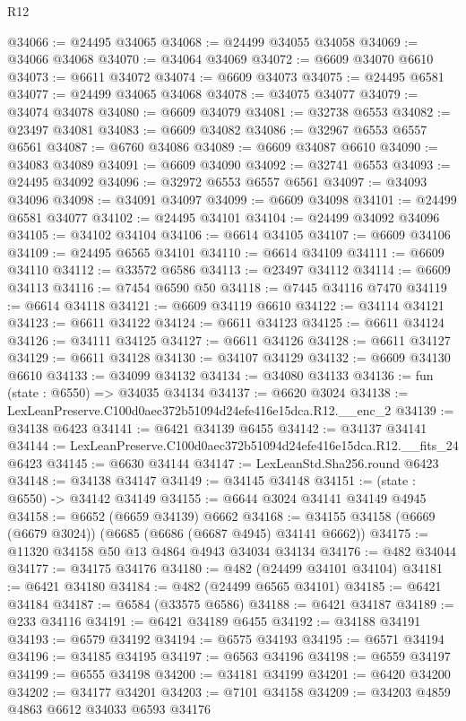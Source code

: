 \begin{lexlean}{R12}
\begin{coremodule}
@34066 := @24495 @34065
@34068 := @24499 @34055 @34058
@34069 := @34066 @34068
@34070 := @34064 @34069
@34072 := @6609 @34070 @6610
@34073 := @6611 @34072
@34074 := @6609 @34073
@34075 := @24495 @6581
@34077 := @24499 @34065 @34068
@34078 := @34075 @34077
@34079 := @34074 @34078
@34080 := @6609 @34079
@34081 := @32738 @6553
@34082 := @23497 @34081
@34083 := @6609 @34082
@34086 := @32967 @6553 @6557 @6561
@34087 := @6760 @34086
@34089 := @6609 @34087 @6610
@34090 := @34083 @34089
@34091 := @6609 @34090
@34092 := @32741 @6553
@34093 := @24495 @34092
@34096 := @32972 @6553 @6557 @6561
@34097 := @34093 @34096
@34098 := @34091 @34097
@34099 := @6609 @34098
@34101 := @24499 @6581 @34077
@34102 := @24495 @34101
@34104 := @24499 @34092 @34096
@34105 := @34102 @34104
@34106 := @6614 @34105
@34107 := @6609 @34106
@34109 := @24495 @6565 @34101
@34110 := @6614 @34109
@34111 := @6609 @34110
@34112 := @33572 @6586
@34113 := @23497 @34112
@34114 := @6609 @34113
@34116 := @7454 @6590 @50
@34118 := @7445 @34116 @7470
@34119 := @6614 @34118
@34121 := @6609 @34119 @6610
@34122 := @34114 @34121
@34123 := @6611 @34122
@34124 := @6611 @34123
@34125 := @6611 @34124
@34126 := @34111 @34125
@34127 := @6611 @34126
@34128 := @6611 @34127
@34129 := @6611 @34128
@34130 := @34107 @34129
@34132 := @6609 @34130 @6610
@34133 := @34099 @34132
@34134 := @34080 @34133
@34136 := fun (state : @6550) => @34035 @34134
@34137 := @6620 @3024
@34138 := LexLeanPreserve.C100d0aec372b51094d24efe416e15dca.R12.__enc_2
@34139 := @34138 @6423
@34141 := @6421 @34139 @6455
@34142 := @34137 @34141
@34144 := LexLeanPreserve.C100d0aec372b51094d24efe416e15dca.R12.__fits_24 @6423
@34145 := @6630 @34144
@34147 := LexLeanStd.Sha256.round @6423
@34148 := @34138 @34147
@34149 := @34145 @34148
@34151 := (state : @6550) -> @34142 @34149
@34155 := @6644 @3024 @34141 @34149 @4945
@34158 := @6652 (@6659 @34139) @6662
@34168 := @34155 @34158 (@6669 (@6679 @3024)) (@6685 (@6686 (@6687 @4945) @34141 @6662))
@34175 := @11320 @34158 @50 @13 @4864 @4943 @34034 @34134
@34176 := @482 @34044
@34177 := @34175 @34176
@34180 := @482 (@24499 @34101 @34104)
@34181 := @6421 @34180
@34184 := @482 (@24499 @6565 @34101)
@34185 := @6421 @34184
@34187 := @6584 (@33575 @6586)
@34188 := @6421 @34187
@34189 := @233 @34116
@34191 := @6421 @34189 @6455
@34192 := @34188 @34191
@34193 := @6579 @34192
@34194 := @6575 @34193
@34195 := @6571 @34194
@34196 := @34185 @34195
@34197 := @6563 @34196
@34198 := @6559 @34197
@34199 := @6555 @34198
@34200 := @34181 @34199
@34201 := @6420 @34200
@34202 := @34177 @34201
@34203 := @7101 @34158
@34209 := @34203 @4859 @4863 @6612 @34033 @6593 @34176

\end{coremodule}
\end{lexlean}
